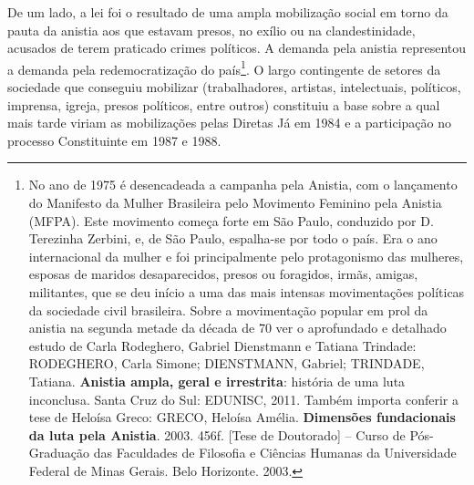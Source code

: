 De um lado, a lei foi o resultado de uma ampla mobilização social em
torno da pauta da anistia aos que estavam presos, no exílio ou na
clandestinidade, acusados de terem praticado crimes políticos. A demanda
pela anistia representou a demanda pela redemocratização do
país\footnote{No ano de 1975 é desencadeada a campanha pela Anistia, com
  o lançamento do Manifesto da Mulher Brasileira pelo Movimento Feminino
  pela Anistia (MFPA). Este movimento começa forte em São Paulo,
  conduzido por D. Terezinha Zerbini, e, de São Paulo, espalha-se por
  todo o país. Era o ano internacional da mulher e foi principalmente
  pelo protagonismo das mulheres, esposas de maridos desaparecidos,
  presos ou foragidos, irmãs, amigas, militantes, que se deu início a
  uma das mais intensas movimentações políticas da sociedade civil
  brasileira. Sobre a movimentação popular em prol da anistia na segunda
  metade da década de 70 ver o aprofundado e detalhado estudo de Carla
  Rodeghero, Gabriel Dienstmann e Tatiana Trindade: RODEGHERO, Carla
  Simone; DIENSTMANN, Gabriel; TRINDADE, Tatiana. \textbf{Anistia ampla,
  geral e irrestrita}: história de uma luta inconclusa. Santa Cruz do
  Sul: EDUNISC, 2011. Também importa conferir a tese de Heloísa Greco:
  GRECO, Heloísa Amélia. \textbf{Dimensões fundacionais da luta pela
  Anistia}. 2003. 456f. {[}Tese de Doutorado{]} -- Curso de
  Pós-Graduação das Faculdades de Filosofia e Ciências Humanas da
  Universidade Federal de Minas Gerais. Belo Horizonte. 2003.}. O largo
contingente de setores da sociedade que conseguiu mobilizar
(trabalhadores, artistas, intelectuais, políticos, imprensa, igreja,
presos políticos, entre outros) constituiu a base sobre a qual mais
tarde viriam as mobilizações pelas Diretas Já em 1984 e a participação
no processo Constituinte em 1987 e 1988.

